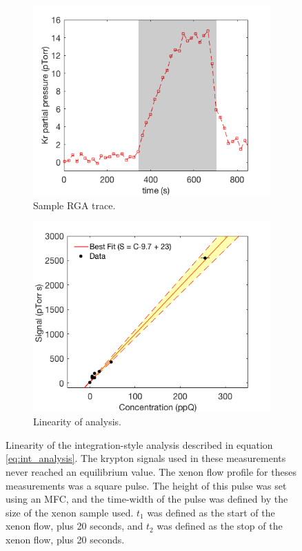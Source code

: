 \begin{figure}[h!]
\centering
\begin{subfigure}{0.5\textwidth}
  \centering
  \includegraphics[width=\textwidth]{Figures/RGATrace_int.png}
  \caption{Sample RGA trace.}
  \label{fig:RGAtrace2}
\end{subfigure}%
\begin{subfigure}{0.5\textwidth}
  \centering
  \includegraphics[width=\textwidth]{Figures/LinPlot0217.png}
  \caption{Linearity of analysis.}
  \label{fig:intlin}
\end{subfigure}
\caption{Linearity of the integration-style analysis described in equation \ref{eq:int_analysis}. The krypton signals used in these measurements never reached an equilibrium value. The xenon flow profile for theses measurements was a square pulse. The height of this pulse was set using an MFC, and the time-width of the pulse was defined by the size of the xenon sample used. $t_1$ was defined as the start of the xenon flow, plus 20 seconds, and $t_2$ was defined as the stop of the xenon flow, plus 20 seconds.}
\label{fig:linplot}
\end{figure}

